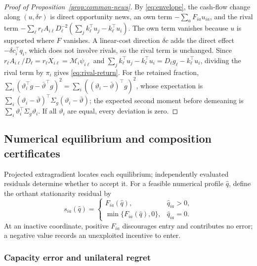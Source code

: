 \begin{proof}[Proof of Proposition~\ref{prop:common-news}]
  By \eqref{eq:envelope}, the cash-flow change along $(u,\delta r)$ is direct
  opportunity news, an own term $-\sum_a F_{ia}u_{ia}$, and the rival term
  $-\sum_\ell r_\ell A_{i\ell}D_\ell^{-2}(\sum_j k_\ell^\top
  u_j-k_\ell^\top u_i)$.
  The own term vanishes because $u$ is supported where $F$ vanishes.
  A linear-cost direction $\delta c$ adds the direct effect
  $-\delta c_i^\top q_i$, which does not involve rivals, so the rival
  term is unchanged.
  Since $r_\ell A_{i\ell}/D_\ell=r_\ell X_{i\ell}=\mathcal M_i\psi_{i\ell}$ and
  $\sum_j k_\ell^\top u_j-k_\ell^\top u_i=D_\ell g_\ell-k_\ell^\top u_i$,
  dividing the rival term by $\pi_i$ gives \eqref{eq:rival-return}.
  For the retained fraction,
  $\sum_i(\vartheta_i^\top g-\bar\vartheta^\top
  g)^2=\sum_i((\vartheta_i-\bar\vartheta)^\top g)^2$,
  whose expectation is
  $\sum_i(\vartheta_i-\bar\vartheta)^\top\Sigma_g(\vartheta_i-\bar\vartheta)$;
  the expected second moment before demeaning is
  $\sum_i\vartheta_i^\top\Sigma_g\vartheta_i$.
  If all $\vartheta_i$ are equal, every deviation is zero.
\end{proof}

\subsection{Numerical equilibrium and composition
certificates}\label{app:certificates}

Projected extragradient locates each equilibrium; independently evaluated
residuals determine whether to accept it.
For a feasible numerical profile $\widehat q$, define the orthant
stationarity residual by
\begin{equation}\label{eq:residual}
  s_{ia}(\widehat q)=
  \begin{cases}
    F_{ia}(\widehat q),&\widehat q_{ia}>0,\\
    \min\{F_{ia}(\widehat q),0\},&\widehat q_{ia}=0.
  \end{cases}
\end{equation}
At an inactive coordinate, positive $F_{ia}$ discourages entry and contributes
no error; a negative value records an unexploited incentive to enter.

\subsubsection{Capacity error and unilateral regret}\label{app:regret-proof}

